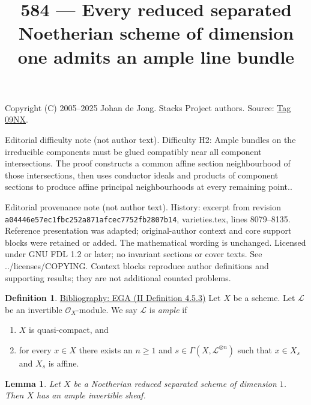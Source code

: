 \documentclass{amsart}
\newenvironment{reference}{\comment}{\endcomment}
\theoremstyle{plain}
\newtheorem{lemma}[subsection]{Lemma}
\theoremstyle{definition}
\newtheorem{definition}[subsection]{Definition}
\theoremstyle{remark}
\numberwithin{equation}{subsection}
\begin{document}
\title[Stacks Project, Tag 09NX]{584 --- Every reduced separated Noetherian scheme of dimension one admits an ample line bundle}
\maketitle
\noindent Copyright (C) 2005--2025 Johan de Jong. Stacks Project authors. Source: \href{https://stacks.math.columbia.edu/tag/09NX}{Tag 09NX}.

\noindent Editorial difficulty note (not author text). Difficulty H2: Ample bundles on the irreducible components must be glued compatibly near all component intersections. The proof constructs a common affine section neighbourhood of those intersections, then uses conductor ideals and products of component sections to produce affine principal neighbourhoods at every remaining point..

\noindent Editorial provenance note (not author text). History: excerpt from revision \texttt{a0444\allowbreak 6e57e\allowbreak c1fbc\allowbreak 252a8\allowbreak 71afc\allowbreak ec775\allowbreak 2fb28\allowbreak 07b14}, varieties.tex, lines 8079--8135. Reference presentation was adapted; original-author context and core support blocks were retained or added. The mathematical wording is unchanged. Licensed under GNU FDL 1.2 or later; no invariant sections or cover texts. See ../licenses/COPYING. Context blocks reproduce author definitions and supporting results; they are not additional counted problems.

\begin{definition}
\label{properties-definition-ample}
\begin{reference}
\href{https://stacks.math.columbia.edu/bibliography}{Bibliography: EGA (II Definition 4.5.3)}
\end{reference}
Let $X$ be a scheme.
Let $\mathcal{L}$ be an invertible $\mathcal{O}_X$-module.
We say $\mathcal{L}$ is {\it ample} if
\begin{enumerate}
\item $X$ is quasi-compact, and
\item for every $x \in X$ there exists an $n \geq 1$
and $s \in \Gamma(X, \mathcal{L}^{\otimes n})$ such
that $x \in X_s$ and $X_s$ is affine.
\end{enumerate}
\end{definition}

\begin{lemma}
\label{lemma-dim-1-noetherian-reduced-separated-has-ample}
Let $X$ be a Noetherian reduced separated scheme of dimension $1$.
Then $X$ has an ample invertible sheaf.
\end{lemma}
\end{document}
